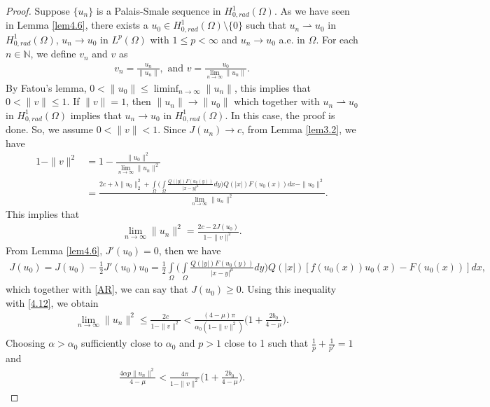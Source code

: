 \documentclass[11pt]{amsart}
\numberwithin{equation}{section}
\newcommand{\hr}{H^1_{0, rad}(\Omega)}
\newcommand{\1}{\frac{1}{2}}
\begin{document}
	\begin{proof}
		Suppose $\{u_n\}$ is a Palais-Smale sequence in $\hr$. As we have seen in Lemma \ref{lem4.6}, there exists a $u_0 \in \hr\setminus\{0\}$ such that $u_n \rightharpoonup u_0$ in $\hr$, $u_n \to u_0$ in $L^p(\Omega)$ with $1 \leq p < \infty$ and $u_n \to u_0 $ a.e. in $\Omega$.  For each $n\in \mathbb N$, we define $v_n$ and $v$ as
		\begin{align*}
			v_n = \frac{u_n}{\|u_n\|} , \text{ and }  v=\frac{u_0}{\displaystyle \lim_{n\to \infty} \|u_n\|}.
		\end{align*}
		By Fatou's lemma, $0 < \|u_0\| \leq \displaystyle \liminf_{n \to \infty} \|u_n\|$, this implies that $0< \|v\| \leq 1$. If $\|v\|=1$, then $\|u_n\| \to \|u_0\|$ which together with $u_n \rightharpoonup u_0$ in $\hr$ implies that $u_n \to u_0$ in $\hr$. In this case, the proof is done. So, we assume $0< \|v\|<1$. Since $J(u_n) \to c$, from Lemma \ref{lem3.2}, we have
		\begin{align}
			1-\|v\|^2 &= 1- \frac{\|u_0\|^2}{\displaystyle\lim_{n\to \infty}\|u_n\|^2}\nonumber\\
			& = \frac{2c+ \lambda \|u_0\|^2_2 + \displaystyle\int\limits_\Omega \Bigg( \int\limits_\Omega \frac{Q(|y|)F(u_0(y))}{|x-y|^\mu}dy \Bigg) Q(|x|)F(u_0(x))dx - \|u_0\|^2}{{\displaystyle\lim_{n\to \infty}}\|u_n\|^2}.\nonumber
		\end{align}
		This implies that
		\begin{align}
			\label{4.12}
			\lim_{n\to \infty}\|u_n\|^2 = \frac{2c-2J(u_0)}{1-\|v\|^2}.
		\end{align}
		From Lemma \ref{lem4.6}, $J'(u_0) = 0$, then we have
		\begin{align}
			J(u_0)= J(u_0) - \1 J'(u_0)u_0 = \1 \int\limits_\Omega \Bigg( \int\limits_\Omega \frac{Q(|y|)F(u_0(y))}{|x-y|^\mu}dy\Bigg)Q(|x|) [f(u_0(x)) u_0(x)- F(u_0(x))] dx, \nonumber
		\end{align}
		which together with \eqref{AR}, we can say that $J(u_0) \geq 0$.
		Using this inequality with \eqref{4.12}, we obtain
		\begin{align}
			\lim_{n\to \infty} \|u_n\|^2 \leq \frac{2c}{1-\|v\|^2} < \frac{(4-\mu)\pi}{\alpha_0(1-\|v\|^2)}\Big( 1+\frac{2b_0}{4-\mu}\Big). \nonumber
		\end{align}
		Choosing $\alpha>\alpha_0$ sufficiently close to $\alpha_0$ and $p>1$ close to 1 such that $\frac{1}{p}+\frac{1}{p'} =1$ and \begin{align}
			\frac{4\alpha p \|u_n\|^2}{4-\mu} < \frac{4\pi}{1-\|v\|^2}\Bigg( 1+\frac{2b_0}{4-\mu}\Bigg).\nonumber

\end{align}
\end{proof}
\end{document}
